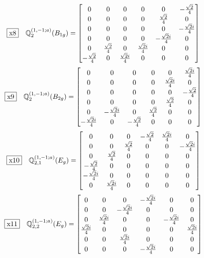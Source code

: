 \documentclass[fleqn,10pt,landscape]{jsarticle}
\begin{document}
\begin{dmath*}
\fbox{x8}\quad \mathbb{Q}_{2}^{(1,-1;a)}(B_{1g})=\begin{bmatrix} 0 & 0 & 0 & 0 & 0 & - \frac{\sqrt{2}}{4} \\ 0 & 0 & 0 & 0 & \frac{\sqrt{2}}{4} & 0 \\ 0 & 0 & 0 & 0 & 0 & - \frac{\sqrt{2} i}{4} \\ 0 & 0 & 0 & 0 & - \frac{\sqrt{2} i}{4} & 0 \\ 0 & \frac{\sqrt{2}}{4} & 0 & \frac{\sqrt{2} i}{4} & 0 & 0 \\ - \frac{\sqrt{2}}{4} & 0 & \frac{\sqrt{2} i}{4} & 0 & 0 & 0 \end{bmatrix}
\end{dmath*}
\begin{dmath*}
\fbox{x9}\quad \mathbb{Q}_{2}^{(1,-1;a)}(B_{2g})=\begin{bmatrix} 0 & 0 & 0 & 0 & 0 & \frac{\sqrt{2} i}{4} \\ 0 & 0 & 0 & 0 & \frac{\sqrt{2} i}{4} & 0 \\ 0 & 0 & 0 & 0 & 0 & - \frac{\sqrt{2}}{4} \\ 0 & 0 & 0 & 0 & \frac{\sqrt{2}}{4} & 0 \\ 0 & - \frac{\sqrt{2} i}{4} & 0 & \frac{\sqrt{2}}{4} & 0 & 0 \\ - \frac{\sqrt{2} i}{4} & 0 & - \frac{\sqrt{2}}{4} & 0 & 0 & 0 \end{bmatrix}
\end{dmath*}
\begin{dmath*}
\fbox{x10}\quad \mathbb{Q}_{2,1}^{(1,-1;a)}(E_{g})=\begin{bmatrix} 0 & 0 & 0 & - \frac{\sqrt{2}}{4} & \frac{\sqrt{2} i}{4} & 0 \\ 0 & 0 & \frac{\sqrt{2}}{4} & 0 & 0 & - \frac{\sqrt{2} i}{4} \\ 0 & \frac{\sqrt{2}}{4} & 0 & 0 & 0 & 0 \\ - \frac{\sqrt{2}}{4} & 0 & 0 & 0 & 0 & 0 \\ - \frac{\sqrt{2} i}{4} & 0 & 0 & 0 & 0 & 0 \\ 0 & \frac{\sqrt{2} i}{4} & 0 & 0 & 0 & 0 \end{bmatrix}
\end{dmath*}
\begin{dmath*}
\fbox{x11}\quad \mathbb{Q}_{2,2}^{(1,-1;a)}(E_{g})=\begin{bmatrix} 0 & 0 & 0 & - \frac{\sqrt{2} i}{4} & 0 & 0 \\ 0 & 0 & - \frac{\sqrt{2} i}{4} & 0 & 0 & 0 \\ 0 & \frac{\sqrt{2} i}{4} & 0 & 0 & - \frac{\sqrt{2} i}{4} & 0 \\ \frac{\sqrt{2} i}{4} & 0 & 0 & 0 & 0 & \frac{\sqrt{2} i}{4} \\ 0 & 0 & \frac{\sqrt{2} i}{4} & 0 & 0 & 0 \\ 0 & 0 & 0 & - \frac{\sqrt{2} i}{4} & 0 & 0 \end{bmatrix}
\end{dmath*}
\end{document}
